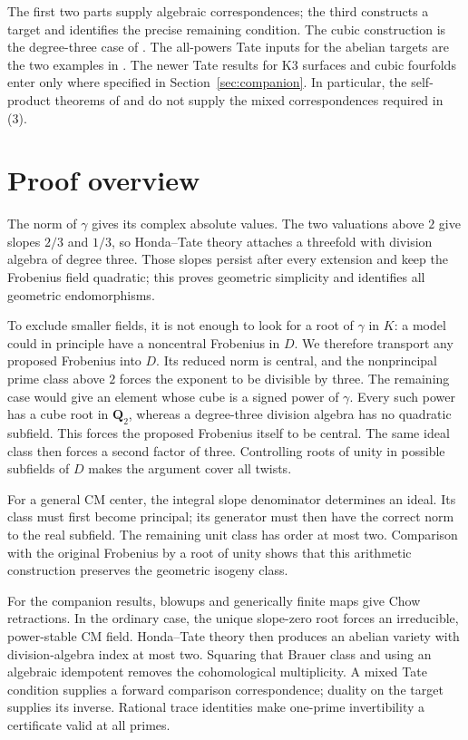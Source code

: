 \documentclass[11pt,a4paper]{article}
\newcommand{\Q}{\mathbf Q}
\theoremstyle{definition}
\theoremstyle{remark}
\begin{document}
The first two parts supply algebraic correspondences; the third
constructs a target and identifies the precise remaining condition.
The cubic construction is the degree-three case of
\citet[Remark 1.10, p.~102]{ShiodaKatsura1979}. The all-powers
Tate inputs for the abelian targets are the two examples in
\citet[Appendix A.7, pp.~158--159]{Milne2001}. The newer Tate
results for K3 surfaces and cubic fourfolds enter only where
specified in Section~\ref{sec:companion}. In particular, the
self-product theorems of \citet[Theorem 1.5]{IIK2021} and
\citet[Corollary 5.2]{Zarhin2004} do not supply the mixed
correspondences required in (3).

\section{Proof overview}

The norm of $\gamma$ gives its complex absolute values. The two
valuations above $2$ give slopes $2/3$ and $1/3$, so Honda--Tate
theory attaches a threefold with division algebra of degree three.
Those slopes persist after every extension and keep the Frobenius
field quadratic; this proves geometric simplicity and identifies all
geometric endomorphisms.

To exclude smaller fields, it is not enough to look for a root of
$\gamma$ in $K$: a model could in principle have a noncentral
Frobenius in $D$. We therefore transport any proposed Frobenius into
$D$. Its reduced norm is central, and the nonprincipal prime class
above $2$ forces the exponent to be divisible by three. The remaining
case would give an element whose cube is a signed power of $\gamma$.
Every such power has a cube root in $\Q_2$, whereas a degree-three
division algebra has no quadratic subfield. This forces the proposed
Frobenius itself to be central. The same ideal class then forces a
second factor of three. Controlling roots of unity in possible
subfields of $D$ makes the argument cover all twists.

For a general CM center, the integral slope denominator determines
an ideal. Its class must first become principal; its generator must
then have the correct norm to the real subfield. The remaining
unit class has order at most two. Comparison with the original
Frobenius by a root of unity shows that this arithmetic construction
preserves the geometric isogeny class.

For the companion results, blowups and generically finite maps give
Chow retractions. In the ordinary case, the unique slope-zero root
forces an irreducible, power-stable CM field. Honda--Tate theory
then produces an abelian variety with division-algebra index at
most two. Squaring that Brauer class and using an algebraic
idempotent removes the cohomological multiplicity. A mixed Tate
condition supplies a forward comparison correspondence; duality
on the target supplies its inverse. Rational trace identities make
one-prime invertibility a certificate valid at all primes.
\end{document}
